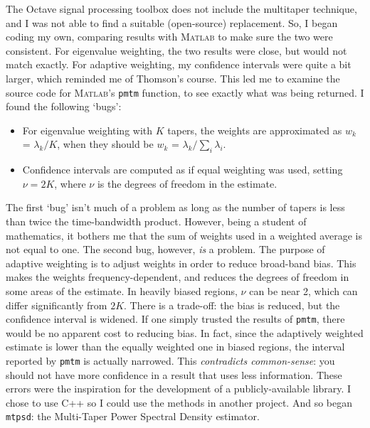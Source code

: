 The Octave signal processing toolbox does not include the multitaper technique,
and I was not able to find a suitable (open-source) replacement.  So, I began 
coding my own, comparing results with \textsc{Matlab} to make sure the two were
consistent.  For eigenvalue weighting, the two results were close, but would 
not match exactly.  For adaptive weighting, my confidence intervals were quite 
a bit larger, which reminded me of Thomson's course.  This led me to examine 
the source code for \textsc{Matlab}'s \texttt{pmtm} function, to see exactly 
what was being returned.  I found the following `bugs':
\begin{itemize}
    \item For eigenvalue weighting with $K$ tapers, the weights are 
        approximated as $w_k$ = $\lambda_k/K$, when they should be 
        $w_k$ = $\lambda_k/\sum_i\lambda_i$.
    \item Confidence intervals are computed as if equal weighting was used, 
        setting $\nu=2K$, where $\nu$ is the degrees of freedom in the estimate.
\end{itemize}
The first `bug' isn't much of a problem as long as the number of tapers is less
than twice the time-bandwidth product.  However, being a student of
mathematics, it bothers me that the sum of weights used in a weighted average 
is not equal to one.  The second bug, however, \emph{is} a problem.  The 
purpose of adaptive weighting is to adjust weights in order to reduce 
broad-band bias.  This makes the weights frequency-dependent, and reduces the
degrees of freedom in some areas of the estimate.  In heavily biased regions, 
$\nu$ can be near 2, which can differ significantly from $2K$.  There is a 
trade-off: the bias is reduced, but the confidence interval is widened.  If one
simply trusted the results of \texttt{pmtm}, there would be no apparent cost to
reducing bias.  In fact, since the adaptively weighted estimate is lower than 
the equally weighted one in biased regions, the interval reported by 
\texttt{pmtm} is actually narrowed.  This \emph{contradicts common-sense}: you 
should not have more confidence in a result that uses less information.  These
errors were the inspiration for the development of a publicly-available 
library.  I chose to use C++ so I could use the methods in another project.  
And so began \texttt{mtpsd}: the Multi-Taper Power Spectral Density estimator.

